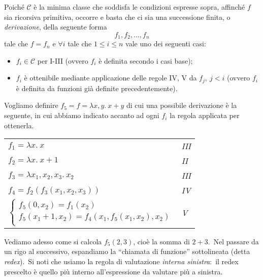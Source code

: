 Poiché $\mathcal{C}$ è la minima classe che soddisfa le condizioni espresse sopra, affinché $f$ sia ricorsiva primitiva, occorre e basta che ci sia una successione finita, o \textit{derivazione}, della seguente forma \[f_1, f_2, \dots,f_n\] tale che $f=f_n$ e $\forall i$ tale che $1 \leq i \leq n$ vale uno dei seguenti casi:
\begin{itemize}
    \item $f_i \in \mathcal{C}$ per I-III (ovvero $f_i$ è definita secondo i casi base);
    \item $f_i$ è ottenibile mediante applicazione delle regole IV, V da $f_j,\ j<i$ (ovvero $f_i$ è definita da funzioni già definite precedentemente).
\end{itemize}

\begin{example}{\label{Somma}}
    Vogliamo definire $f_5=f=\lambda x,y.\ x+y$ di cui una possibile derivazione è la seguente, in cui abbiamo indicato accanto ad ogni $f_i$ la regola applicata per ottenerla.

    \begin{table}[H]
        \centering
        \begin{tabular}{l l}
            $f_1=\lambda x.\ x$             & \textit{III} \\
            $f_2=\lambda x.\ x+1$           & \textit{II}  \\
            $f_3=\lambda x_1,x_2,x_3.\ x_2$ & \textit{III} \\
            $f_4=f_2(f_3(x_1,x_2,x_3))$     & \textit{IV}  \\
            $\begin{cases}
                    f_5(0,x_2) = f_1(x_2)                      \\
                    f_5(x_1+1,x_2) = f_4(x_1,f_5(x_1,x_2),x_2) \\
                \end{cases}$     & \textit{V}   \\
        \end{tabular}
    \end{table}

    \noindent Vediamo adesso come si calcola $f_5(2,3)$, cioè la somma di $2+3$.\
    Nel passare da un rigo al successivo, espandiamo la ``chiamata di funzione'' sottolineata (detta \textit{redex}).\
    Si noti che usiamo la regola di valutazione \textit{interna sinistra}:\ il redex prescelto è quello più interno all'espressione da valutare più a sinistra.\


\end{example}
